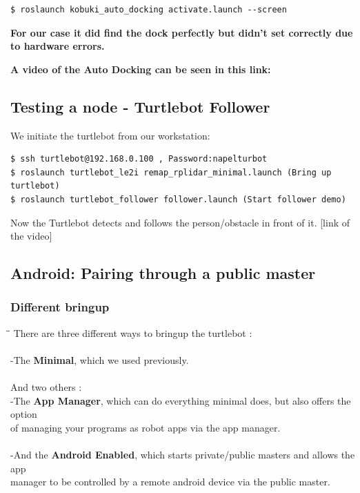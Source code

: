 \documentclass[10pt,a4paper]{article}
\begin{document}
\begin{lstlisting}[frame=single] 
$ roslaunch kobuki_auto_docking activate.launch --screen
\end{lstlisting}

\textbf{For our case it did find the dock perfectly but didn't set correctly due to hardware errors.}

\textbf{A video of the Auto Docking can be seen in this link:}\\

\subsection{Testing a node - Turtlebot Follower}
We initiate the turtlebot from our workstation:
\begin{lstlisting}[frame=single]
$ ssh turtlebot@192.168.0.100 , Password:napelturbot
$ roslaunch turtlebot_le2i remap_rplidar_minimal.launch (Bring up turtlebot)
$ roslaunch turtlebot_follower follower.launch (Start follower demo)
\end{lstlisting}
Now the Turtlebot detects and follows the person/obstacle in front of it.
[link of the video]

\subsection{Android: Pairing through a public master}

\subsubsection{Different bringup}

\begin{tabbing}
\hspace{1cm}\=\hspace{1cm}\=\kill
There are three different ways to bringup the turtlebot :\\\\

\> -The \textbf{Minimal}, which we used previously.\\\\



 And two others : \\
\> -The \textbf{App Manager}, which can do everything minimal does, but also offers the option \\ of managing your programs as robot apps via the app manager.\\\\

\> -And the \textbf{Android Enabled}, which starts private/public masters and allows the app \\ manager to be controlled by a remote android device via the public master.\\\\
\end{tabbing}
\end{document}
